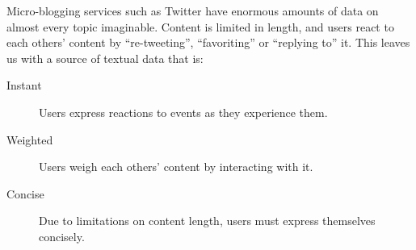
Micro-blogging services such as Twitter have enormous amounts of data on almost every topic imaginable.
Content is limited in length, and users react to each others' content by ``re-tweeting'', ``favoriting'' or ``replying to'' it.
This leaves us with a source of textual data that is:

\begin{description}
  \item[Instant] Users express reactions to events as they experience them.
  \item[Weighted] Users weigh each others' content by interacting with it.
  \item[Concise] Due to limitations on content length, users must express themselves concisely.
\end{description}

% 
% 
% 
% 
% 


